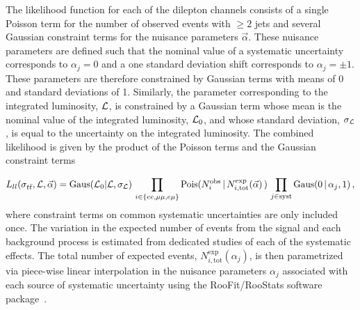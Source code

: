 The likelihood function for each of the dilepton channels consists of a single Poisson term for the number of observed events with $\ge2$ jets and several Gaussian constraint terms for the nuisance parameters $\vec{\alpha}$.   
These nuisance parameters are defined such that the nominal value of a systematic uncertainty corresponds to $\alpha_j = 0$ and a one standard deviation shift corresponds to $\alpha_j = \pm 1$.
These parameters are therefore constrained by Gaussian terms with means of 0 and standard deviations of 1.
Similarly, the parameter corresponding to the integrated luminosity, ${\cal L}$, is constrained by a Gaussian term whose mean is the nominal value of the integrated luminosity, ${\cal L}_{0}$, and whose standard deviation, $\sigma_{{\cal L}}$, is equal to the uncertainty on the integrated luminosity.
The combined likelihood is given by the product of the Poisson terms and the Gaussian constraint terms

\begin{equation}\label{Eq:dileplikelihood}
  L_{ll}(\sigma_{t\bar{t}}, {\cal L}, \vec{\alpha}) = \text{Gaus}({\cal L}_0 | {\cal L}, \sigma_{\cal L})\, \prod_{i\in \{ ee,\mu\mu,e\mu\} }  \text{Pois}(N^{\text{obs}}_i \,|\, N^{\text{exp}}_{i, \text{tot}}(\vec{\alpha})\,) \,  \prod_{j\in \text{syst}} \text{Gaus}( 0 \,|\, \alpha_{j}, 1) \,,
\end{equation}
where constraint terms on common systematic uncertainties are only included once.  
The variation in the expected number of events from the signal and each background process is estimated from dedicated studies of each of the systematic effects.  
The total number of expected events, $N^{\text{exp}}_{i,\text{tot}}(\alpha_j)$, is then parametrized via piece-wise linear interpolation in the nuisance parameters $\alpha_j$ associated with each source of systematic uncertainty using the RooFit/RooStats software package~\cite{Verkerke:2003ir,Moneta:2010pm}.


